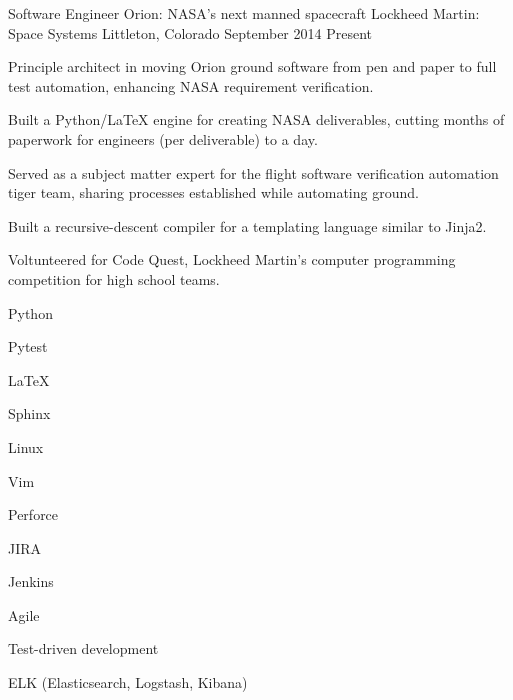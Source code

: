 \begin{cventries}
  \cventry%
    {Software Engineer \- Orion: NASA's next manned spacecraft} %
    {Lockheed Martin: Space Systems} %
    {Littleton, Colorado} %
    {September 2014 \- Present} %
    {%
      \begin{cvitems} %
        \item {Principle architect in moving Orion ground software from pen and paper to full test automation, enhancing NASA requirement verification.}
        \item {Built a Python/LaTeX engine for creating NASA deliverables, cutting months of paperwork for engineers (per deliverable) to a day.}
        \item {Served as a subject matter expert for the flight software verification automation tiger team, sharing processes established while automating ground.}
        \item {Built a recursive-descent compiler for a templating language similar to Jinja2.}
        \item {Voltunteered for Code Quest, Lockheed Martin's computer programming competition for high school teams.}
      \end{cvitems}
    }
    \begin{cventryskills}
      \item Python
      \item Pytest
      \item LaTeX
      \item Sphinx
      \item Linux
      \item Vim
      \item Perforce
      \item JIRA
      \item Jenkins
      \item Agile
      \item Test-driven development
      \item ELK (Elasticsearch, Logstash, Kibana)
    \end{cventryskills}


\end{cventries}
